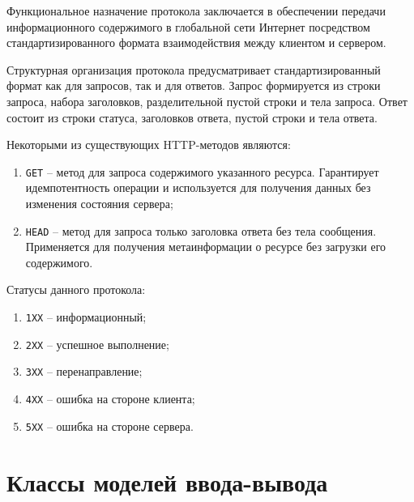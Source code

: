 Функциональное назначение протокола заключается в обеспечении передачи информационного содержимого в глобальной сети Интернет посредством стандартизированного формата взаимодействия между клиентом и сервером. 

Структурная организация протокола предусматривает стандартизированный формат как для запросов, так и для ответов. Запрос формируется из строки запроса, набора заголовков, разделительной пустой строки и тела запроса. Ответ состоит из строки статуса, заголовков ответа, пустой строки и тела ответа. 

Некоторыми из существующих HTTP-методов являются:
\begin{enumerate}
	\item \texttt{GET} -- метод для запроса содержимого указанного ресурса. Гарантирует идемпотентность операции и используется для получения данных без изменения состояния сервера;
	\item \texttt{HEAD} -- метод для запроса только заголовка ответа без тела сообщения. Применяется для получения метаинформации о ресурсе без загрузки его содержимого.
\end{enumerate}

Статусы данного протокола:
\begin{enumerate}
	\item \texttt{1XX} -- информационный;
	\item \texttt{2XX} -- успешное выполнение;
	\item \texttt{3XX} -- перенаправление;
	\item \texttt{4XX} -- ошибка на стороне клиента;
	\item \texttt{5XX} -- ошибка на стороне сервера.
\end{enumerate}

\section{Классы моделей ввода-вывода}


